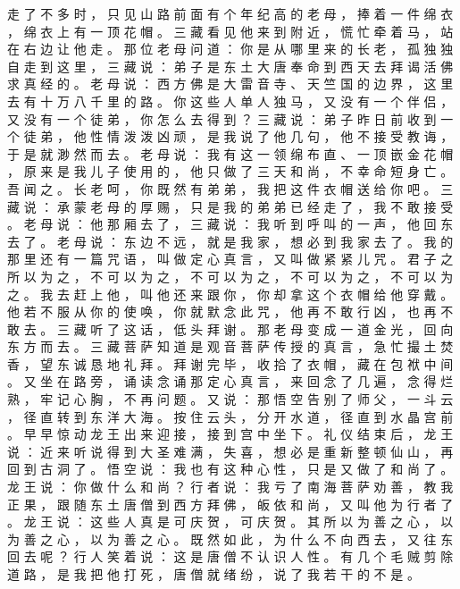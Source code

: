 {走 了 不 多 时 ， 只 见 山 路 前 面 有 个 年 纪 高 的 老 母 ， 捧 着 一 件 绵 衣 ， 绵 衣 上 有 一 顶 花 帽 。
三 藏 看 见 他 来 到 附 近 ， 慌 忙 牵 着 马 ， 站 在 右 边 让 他 走 。
那 位 老 母 问 道 ： 你 是 从 哪 里 来 的 长 老 ， 孤 独 独 自 走 到 这 里 ， 三 藏 说 ： 弟 子 是 东 土 大 唐 奉 命 到 西 天 去 拜 谒 活 佛 求 真 经 的 。
老 母 说 ： 西 方 佛 是 大 雷 音 寺 、 天 竺 国 的 边 界 ， 这 里 去 有 十 万 八 千 里 的 路 。
你 这 些 人 单 人 独 马 ， 又 没 有 一 个 伴 侣 ， 又 没 有 一 个 徒 弟 ， 你 怎 么 去 得 到 ？ 三 藏 说 ： 弟 子 昨 日 前 收 到 一 个 徒 弟 ， 他 性 情 泼 泼 凶 顽 ， 是 我 说 了 他 几 句 ， 他 不 接 受 教 诲 ， 于 是 就 渺 然 而 去 。
老 母 说 ： 我 有 这 一 领 绵 布 直 、 一 顶 嵌 金 花 帽 ， 原 来 是 我 儿 子 使 用 的 ， 他 只 做 了 三 天 和 尚 ， 不 幸 命 短 身 亡 。
吾 闻 之 。
长 老 呵 ， 你 既 然 有 弟 弟 ， 我 把 这 件 衣 帽 送 给 你 吧 。
三 藏 说 ： 承 蒙 老 母 的 厚 赐 ， 只 是 我 的 弟 弟 已 经 走 了 ， 我 不 敢 接 受 。
老 母 说 ： 他 那 厢 去 了 ， 三 藏 说 ： 我 听 到 呼 叫 的 一 声 ， 他 回 东 去 了 。
老 母 说 ： 东 边 不 远 ， 就 是 我 家 ， 想 必 到 我 家 去 了 。
我 的 那 里 还 有 一 篇 咒 语 ， 叫 做 定 心 真 言 ， 又 叫 做 紧 紧 儿 咒 。
君 子 之 所 以 为 之 ， 不 可 以 为 之 ， 不 可 以 为 之 ， 不 可 以 为 之 ， 不 可 以 为 之 。
我 去 赶 上 他 ， 叫 他 还 来 跟 你 ， 你 却 拿 这 个 衣 帽 给 他 穿 戴 。
他 若 不 服 从 你 的 使 唤 ， 你 就 默 念 此 咒 ， 他 再 不 敢 行 凶 ， 也 再 不 敢 去 。
三 藏 听 了 这 话 ， 低 头 拜 谢 。
那 老 母 变 成 一 道 金 光 ， 回 向 东 方 而 去 。
三 藏 菩 萨 知 道 是 观 音 菩 萨 传 授 的 真 言 ， 急 忙 撮 土 焚 香 ， 望 东 诚 恳 地 礼 拜 。
拜 谢 完 毕 ， 收 拾 了 衣 帽 ， 藏 在 包 袱 中 间 。
又 坐 在 路 旁 ， 诵 读 念 诵 那 定 心 真 言 ， 来 回 念 了 几 遍 ， 念 得 烂 熟 ， 牢 记 心 胸 ， 不 再 问 题 。
又 说 ： 那 悟 空 告 别 了 师 父 ， 一 斗 云 ， 径 直 转 到 东 洋 大 海 。
按 住 云 头 ， 分 开 水 道 ， 径 直 到 水 晶 宫 前 。
早 早 惊 动 龙 王 出 来 迎 接 ， 接 到 宫 中 坐 下 。
礼 仪 结 束 后 ， 龙 王 说 ： 近 来 听 说 得 到 大 圣 难 满 ， 失 喜 ， 想 必 是 重 新 整 顿 仙 山 ， 再 回 到 古 洞 了 。 悟 空 说 ： 我 也 有 这 种 心 性 ， 只 是 又 做 了 和 尚 了 。
龙 王 说 ： 你 做 什 么 和 尚 ？ 行 者 说 ： 我 亏 了 南 海 菩 萨 劝 善 ， 教 我 正 果 ， 跟 随 东 土 唐 僧 到 西 方 拜 佛 ， 皈 依 和 尚 ， 又 叫 他 为 行 者 了 。
龙 王 说 ： 这 些 人 真 是 可 庆 贺 ， 可 庆 贺 。
其 所 以 为 善 之 心 ， 以 为 善 之 心 ， 以 为 善 之 心 。
既 然 如 此 ， 为 什 么 不 向 西 去 ， 又 往 东 回 去 呢 ？ 行 人 笑 着 说 ： 这 是 唐 僧 不 认 识 人 性 。
有 几 个 毛 贼 剪 除 道 路 ， 是 我 把 他 打 死 ， 唐 僧 就 绪 纷 ， 说 了 我 若 干 的 不 是 。
}
